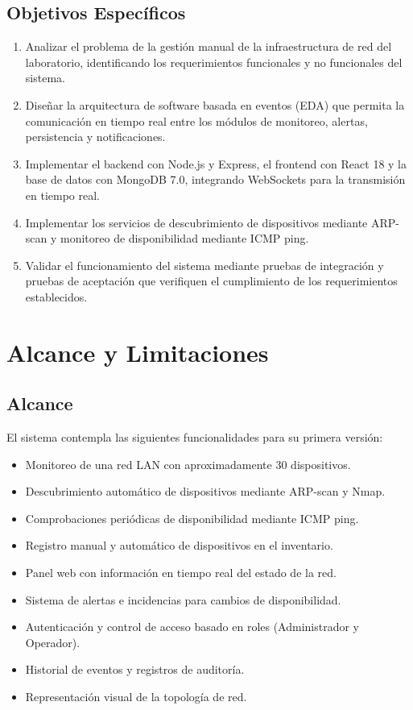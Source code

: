 \documentclass[12pt,a4paper]{report}
\begin{document}
\section{Objetivos Específicos}

\begin{enumerate}
  \item Analizar el problema de la gestión manual de la infraestructura de red del laboratorio, identificando los requerimientos funcionales y no funcionales del sistema.
  \item Diseñar la arquitectura de software basada en eventos (EDA) que permita la comunicación en tiempo real entre los módulos de monitoreo, alertas, persistencia y notificaciones.
  \item Implementar el backend con Node.js y Express, el frontend con React 18 y la base de datos con MongoDB 7.0, integrando WebSockets para la transmisión en tiempo real.
  \item Implementar los servicios de descubrimiento de dispositivos mediante ARP-scan y monitoreo de disponibilidad mediante ICMP ping.
  \item Validar el funcionamiento del sistema mediante pruebas de integración y pruebas de aceptación que verifiquen el cumplimiento de los requerimientos establecidos.
\end{enumerate}

\chapter{Alcance y Limitaciones}

\section{Alcance}

El sistema contempla las siguientes funcionalidades para su primera versión:

\begin{itemize}
  \item Monitoreo de una red LAN con aproximadamente 30 dispositivos.
  \item Descubrimiento automático de dispositivos mediante ARP-scan y Nmap.
  \item Comprobaciones periódicas de disponibilidad mediante ICMP ping.
  \item Registro manual y automático de dispositivos en el inventario.
  \item Panel web con información en tiempo real del estado de la red.
  \item Sistema de alertas e incidencias para cambios de disponibilidad.
  \item Autenticación y control de acceso basado en roles (Administrador y Operador).
  \item Historial de eventos y registros de auditoría.
  \item Representación visual de la topología de red.
\end{itemize}
\end{document}

